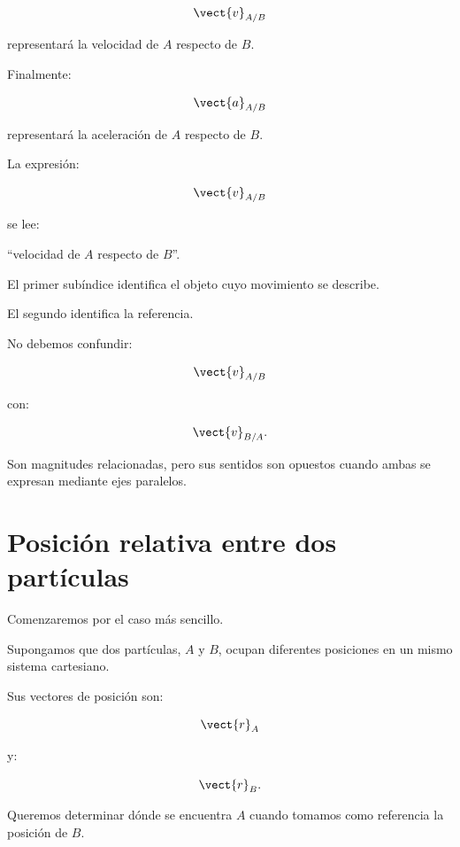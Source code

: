 \[
\vect{v}_{A/B}
\]

representará la velocidad de \(A\) respecto de \(B\).

Finalmente:

\[
\vect{a}_{A/B}
\]

representará la aceleración de \(A\) respecto de \(B\).

\begin{recordatorio}

La expresión:

\[
\vect{v}_{A/B}
\]

se lee:

\begin{center}
``velocidad de \(A\) respecto de \(B\)''.
\end{center}

El primer subíndice identifica el objeto cuyo movimiento
se describe.

El segundo identifica la referencia.

\end{recordatorio}

No debemos confundir:

\[
\vect{v}_{A/B}
\]

con:

\[
\vect{v}_{B/A}.
\]

Son magnitudes relacionadas, pero sus sentidos son opuestos
cuando ambas se expresan mediante ejes paralelos.


\section{Posición relativa entre dos partículas}

Comenzaremos por el caso más sencillo.

Supongamos que dos partículas, \(A\) y \(B\), ocupan
diferentes posiciones en un mismo sistema cartesiano.

Sus vectores de posición son:

\[
\vect{r}_A
\]

y:

\[
\vect{r}_B.
\]

Queremos determinar dónde se encuentra \(A\) cuando tomamos
como referencia la posición de \(B\).

